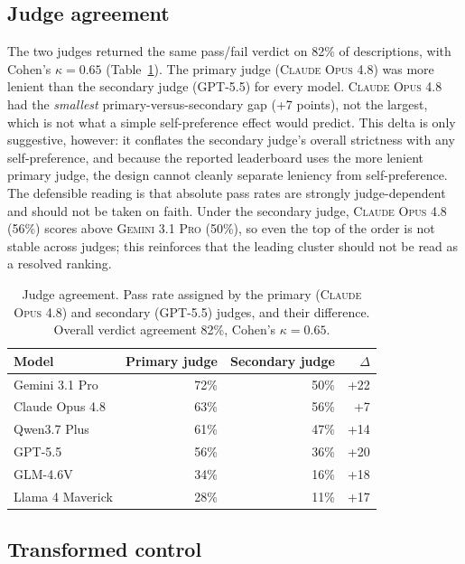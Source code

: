 \documentclass[11pt]{article}
\newcommand{\model}[1]{\textsc{#1}}
\begin{document}
\subsection{Judge agreement}

The two judges returned the same pass/fail verdict on 82\% of descriptions, with Cohen's $\kappa=0.65$ (Table~\ref{tab:judges}). The primary judge (\model{Claude Opus 4.8}) was more lenient than the secondary judge (\model{GPT-5.5}) for every model. \model{Claude Opus 4.8} had the \emph{smallest} primary-versus-secondary gap (+7 points), not the largest, which is not what a simple self-preference effect would predict. This delta is only suggestive, however: it conflates the secondary judge's overall strictness with any self-preference, and because the reported leaderboard uses the more lenient primary judge, the design cannot cleanly separate leniency from self-preference. The defensible reading is that absolute pass rates are strongly judge-dependent and should not be taken on faith. Under the secondary judge, \model{Claude Opus 4.8} (56\%) scores above \model{Gemini 3.1 Pro} (50\%), so even the top of the order is not stable across judges; this reinforces that the leading cluster should not be read as a resolved ranking.

\begin{table}[t]
\centering
\caption{Judge agreement. Pass rate assigned by the primary (\model{Claude Opus 4.8}) and secondary (\model{GPT-5.5}) judges, and their difference. Overall verdict agreement 82\%, Cohen's $\kappa=0.65$.}
\label{tab:judges}
\begin{tabular}{lrrr}
\toprule
Model & Primary judge & Secondary judge & $\Delta$ \\
\midrule
Gemini 3.1 Pro & 72\% & 50\% & +22 \\
Claude Opus 4.8 & 63\% & 56\% & +7 \\
Qwen3.7 Plus & 61\% & 47\% & +14 \\
GPT-5.5 & 56\% & 36\% & +20 \\
GLM-4.6V & 34\% & 16\% & +18 \\
Llama 4 Maverick & 28\% & 11\% & +17 \\
\bottomrule
\end{tabular}
\end{table}

\subsection{Transformed control}
\end{document}
